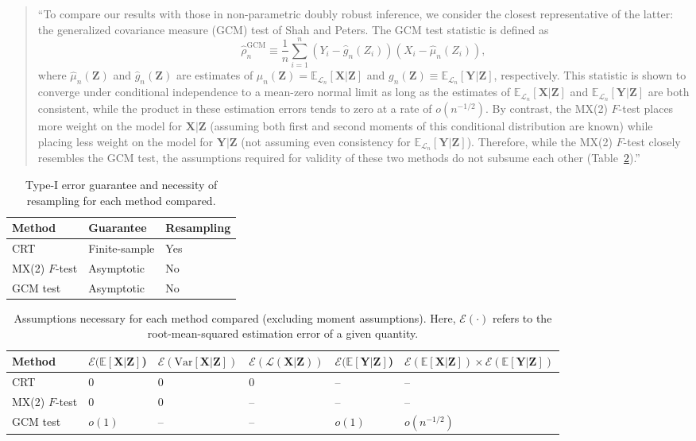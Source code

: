 \documentclass[12pt]{article}
\begin{document}
\begin{enumerate}
\begin{quote}
``To compare our results with those in non-parametric doubly robust inference, we consider the closest representative of the latter: the generalized covariance measure (GCM) test of Shah and Peters. The GCM test statistic is defined as
\begin{equation}
	\widehat \rho^{\text{GCM}}_n \equiv \frac{1}{n}\sum_{i = 1}^n  (Y_i - \widehat g_n(Z_i))(X_i - \widehat \mu_n(Z_i)),
\end{equation}
where $\widehat \mu_n(\bm Z)$ and $\widehat g_n(\bm Z)$ are estimates of $\mu_n(\bm Z) = \mathbb E_{\mathcal L_n}[\bm X|\bm Z]$ and $g_n(\bm Z) \equiv \mathbb E_{\mathcal L_n}[\bm Y|\bm Z]$, respectively. This statistic is shown to converge under conditional independence to a mean-zero normal limit as long as the estimates of $\mathbb E_{\mathcal L_n}[\bm X|\bm Z]$ and $\mathbb E_{\mathcal L_n}[\bm Y|\bm Z]$ are both consistent, while the product in these estimation errors tends to zero at a rate of $o(n^{-1/2})$. By contrast, the MX(2) $F$-test places more weight on the model for $\bm X|\bm Z$ (assuming both first and second moments of this conditional distribution are known) while placing less weight on the model for $\bm Y|\bm Z$ (not assuming even consistency for $\mathbb E_{\mathcal L_n}[\bm Y|\bm Z]$). Therefore, while the MX(2) $F$-test closely resembles the GCM test, the assumptions required for validity of these two methods do not subsume each other (Table~\ref{tab:summary-2}).''
\end{quote}

	\begin{table}[h!]
	\centering
	\begin{tabular}{l|ll}
		Method & Guarantee & Resampling \\
		\hline
		CRT & Finite-sample & Yes \\	
		MX(2) $F$-test & Asymptotic & No  \\
		GCM test & Asymptotic & No
	\end{tabular}
	\caption{Type-I error guarantee and necessity of resampling for each method compared.}
	\label{tab:summary-1}
\end{table}

\begin{table}[h!]
	\small
	\begin{tabular}{l|lllll}
		Method & $\mathcal E(\mathbb E[\bm X|\bm Z]$) & $\mathcal E(\text{Var}[\bm X|\bm Z])$ & $\mathcal E(\mathcal L(\bm X|\bm Z))$ & $\mathcal E(\mathbb E[\bm Y|\bm Z]$) & $\mathcal E(\mathbb E[\bm X|\bm Z]) \times \mathcal E(\mathbb E[\bm Y|\bm Z])$ \\
		\hline
		CRT & 0 & 0 & 0 & --& --  \\
		MX(2) $F$-test  & 0 & 0 & -- & -- & -- \\
		GCM test & $o(1)$ & -- & -- & $o(1)$ & $o(n^{-1/2})$
	\end{tabular}
	\caption{Assumptions necessary for each method compared (excluding moment assumptions). Here, $\mathcal E(\cdot)$ refers to the root-mean-squared estimation error of a given quantity.}
	\label{tab:summary-2}
\end{table}
\end{enumerate}
\end{document}
